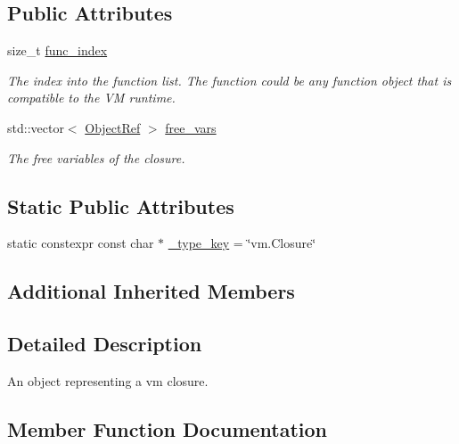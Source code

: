 \subsection*{Public Attributes}
\begin{DoxyCompactItemize}
\item 
size\+\_\+t \hyperlink{classtvm_1_1runtime_1_1vm_1_1VMClosureObj_af252588d00a4e0b7086edcea4cdfae6f}{func\+\_\+index}
\begin{DoxyCompactList}\small\item\em The index into the function list. The function could be any function object that is compatible to the VM runtime. \end{DoxyCompactList}\item 
std\+::vector$<$ \hyperlink{classtvm_1_1runtime_1_1ObjectRef}{Object\+Ref} $>$ \hyperlink{classtvm_1_1runtime_1_1vm_1_1VMClosureObj_ab16d6772f7b61f37b47ee7aa30aaa4cd}{free\+\_\+vars}
\begin{DoxyCompactList}\small\item\em The free variables of the closure. \end{DoxyCompactList}\end{DoxyCompactItemize}
\subsection*{Static Public Attributes}
\begin{DoxyCompactItemize}
\item 
static constexpr const char $\ast$ \hyperlink{classtvm_1_1runtime_1_1vm_1_1VMClosureObj_a704c7fdf838ecd4295823f484818d94d}{\+\_\+type\+\_\+key} = \char`\"{}vm.\+Closure\char`\"{}
\end{DoxyCompactItemize}
\subsection*{Additional Inherited Members}


\subsection{Detailed Description}
An object representing a vm closure. 

\subsection{Member Function Documentation}
